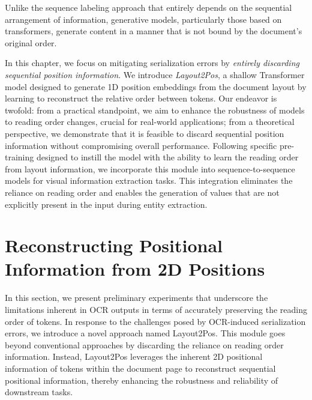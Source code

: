 Unlike the sequence labeling approach that entirely depends on the sequential arrangement of information, generative models, particularly those based on transformers, generate content in a manner that is not bound by the document's original order.


In this chapter, we focus on mitigating serialization errors by \textit{entirely discarding sequential position information}. We introduce \textit{Layout2Pos}, a shallow Transformer model designed to generate 1D position embeddings from the document layout by learning to reconstruct the relative order between tokens. Our endeavor is twofold: from a practical standpoint, we aim to enhance the robustness of models to reading order changes, crucial for real-world applications; from a theoretical perspective, we demonstrate that it is feasible to discard sequential position information without compromising overall performance. Following specific pre-training designed to instill the model with the ability to learn the reading order from layout information, we incorporate this module into sequence-to-sequence models for visual information extraction tasks. This integration eliminates the reliance on reading order and enables the generation of values that are not explicitly present in the input during entity extraction.


\section{Reconstructing Positional Information from 2D Positions}

In this section, we present preliminary experiments that underscore the limitations inherent in OCR outputs in terms of accurately preserving the reading order of tokens. In response to the challenges posed by OCR-induced serialization errors, we introduce a novel approach named Layout2Pos. This module goes beyond conventional approaches by discarding the reliance on reading order information. Instead, Layout2Pos leverages the inherent 2D positional information of tokens within the document page to reconstruct sequential positional information, thereby enhancing the robustness and reliability of downstream tasks.

